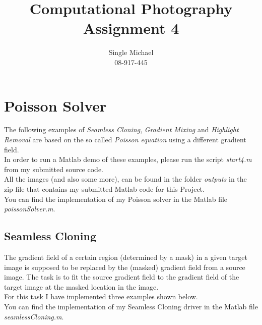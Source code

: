 \documentclass{paper}
\title{Computational Photography Assignment 4}
\author{Single Michael\\08-917-445}
\begin{document}
\maketitle


\section{Poisson Solver}

The following examples of \emph{Seamless Cloning}, \emph{Gradient Mixing} and \emph{Highlight Removal} are based on the so called \emph{Poisson equation} using a different gradient field. \\

In order to run a Matlab demo of these examples, please run the script \emph{start4.m} from my submitted source code. \\

All the images (and also some more), can be found in the folder \emph{outputs} in the zip file that contains my submitted Matlab code for this Project. \\

You can find the implementation of my Poisson solver in the Matlab file \emph{poissonSolver.m}.

\subsection{Seamless Cloning}

The gradient field of a certain region (determined by a mask) in a given target image is supposed to be replaced by the (masked) gradient field from a source image. The task is to fit the source gradient field to the gradient field of the target image at the masked location in the image. \\

For this task I have implemented three examples shown below. \\

You can find the implementation of my Seamless Cloning driver in the Matlab file \emph{seamlessCloning.m}.

\end{document}
